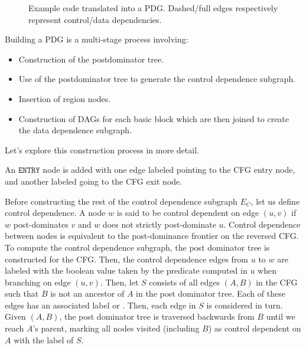 \begin{figure}
\centering
{}
\caption{Example code translated into a PDG. Dashed/full edges respectively represent control/data dependencies.}
\label{fig:pdg}
\end{figure}

Building a PDG is a multi-stage process involving:

\begin{itemize}
\item Construction of the postdominator tree.
\item Use of the postdominator tree to generate the control dependence subgraph.
\item Insertion of region nodes.
\item Construction of DAGs for each basic block which are then joined to create the data dependence subgraph.
\end{itemize}

Let's explore this construction process in more detail.

An $\texttt{ENTRY}$ node is added with one edge labeled \true pointing to the CFG entry node, and another labeled \false going to the CFG exit node. 

Before constructing the rest of the control dependence subgraph $E_C$, let us define control dependence. A node $w$ is said to be control dependent on edge $(u,v)$ if $w$ post-dominates $v$ and $w$ does not strictly post-dominate $u$.
Control dependence between nodes is equivalent to the post-dominance frontier on the reversed CFG. To compute the control dependence subgraph, the post dominator tree is constructed for the CFG. 
Then, the control dependence edges from $u$ to $w$ are labeled with the boolean value taken by the predicate computed in $u$ when branching on edge $(u,v)$. 
Then, let $S$ consists of all edges $(A,B)$ in the CFG such that $B$ is not an ancestor of $A$ in the post dominator tree. 
Each of these edges has an associated label \true or \false. 
Then, each edge in $S$ is considered in turn. 
Given $(A,B)$, the post dominator tree is traversed backwards from $B$ until we reach $A$'s parent, marking all nodes visited (including $B$) as control dependent on $A$ with the label of $S$.

